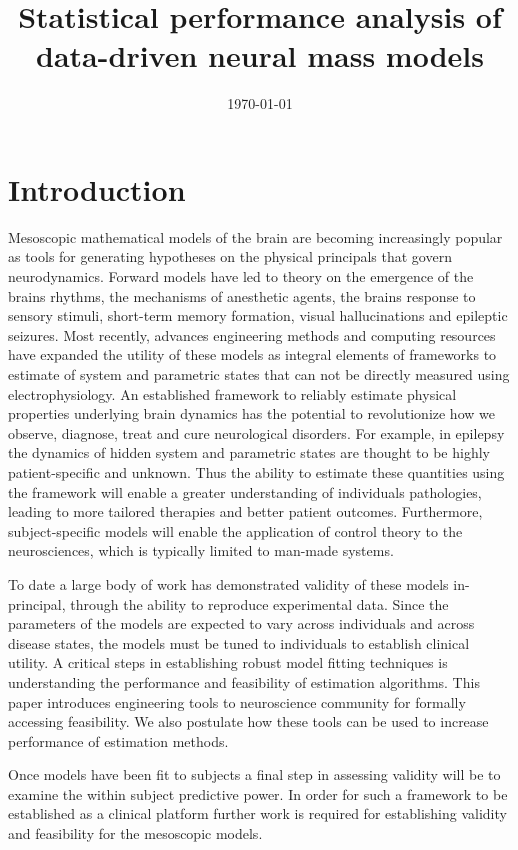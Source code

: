 \documentclass{article}
\title{Statistical performance analysis of data-driven neural mass models}
\date{\today}
\begin{document}
\section{Introduction}
\label{sec:introduction}

Mesoscopic mathematical models of the brain are becoming increasingly popular as tools for generating hypotheses on the physical principals that govern neurodynamics. Forward models have led to theory on the emergence of the brains rhythms, the mechanisms of anesthetic agents, the brains response to sensory stimuli, short-term memory formation, visual hallucinations and epileptic seizures. Most recently, advances engineering methods and computing resources have expanded the utility of these models as integral elements of frameworks to estimate of system and parametric states that can not be directly measured using electrophysiology. An established framework to reliably estimate physical properties underlying brain dynamics has the potential to revolutionize how we observe, diagnose, treat and cure neurological disorders. For example, in epilepsy the dynamics of hidden system and parametric states are thought to be highly patient-specific and unknown. Thus the ability to estimate these quantities using the framework will enable a greater understanding of individuals pathologies, leading to more tailored therapies and better patient outcomes.  Furthermore, subject-specific models will enable the application of control theory to the neurosciences, which is typically limited to man-made systems.

To date a large body of work has demonstrated validity of these models in-principal, through the ability to reproduce experimental data. Since the parameters of the models are expected to vary across individuals and across disease states, the models must be tuned to individuals to establish clinical utility. A critical steps in establishing robust model fitting techniques is understanding the performance and feasibility of estimation algorithms. This paper introduces engineering tools to neuroscience community for formally accessing feasibility. We also postulate how these tools can be used to increase performance of estimation methods.

Once models have been fit to subjects a final step in assessing validity will be to examine the within subject predictive power. In order for such a framework to be established as a clinical platform further work is required for establishing validity and feasibility for the mesoscopic models.  
\end{document}

